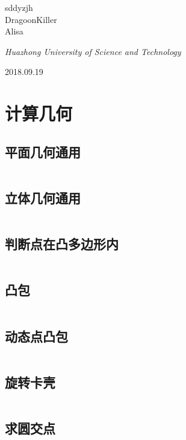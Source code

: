 \documentclass[UTF8]{ctexart}
\begin{document}
\begin{titlepage}
	{\protect sddyzjh \\ DragoonKiller \\ Alisa \\} %
	
	\vspace{0.5\baselineskip} %
	
	\textit{Huazhong University of Science and Technology} %
	
	\vfill %
	
	
\date{\today}
	2018.09.19 %
	

\end{titlepage}
\setcounter{secnumdepth}{0}
\tableofcontents
\newpage
\section{计算几何}
\subsection{平面几何通用}
\inputminted{cpp}{calcgeometry/平面几何通用.cpp}
\subsection{立体几何通用}
\inputminted{cpp}{calcgeometry/立体几何通用.cpp}
\subsection{判断点在凸多边形内}
\inputminted{cpp}{calcgeometry/判断点在凸多边形内.cpp}
\subsection{凸包}
\inputminted{cpp}{calcgeometry/凸包.cpp}
\subsection{动态点凸包}
\inputminted{cpp}{calcgeometry/动态点凸包.cpp}
\subsection{旋转卡壳}
\inputminted{cpp}{calcgeometry/旋转卡壳.cpp}
\subsection{求圆交点}
\inputminted{cpp}{calcgeometry/求圆交点.cpp}
\end{document}
